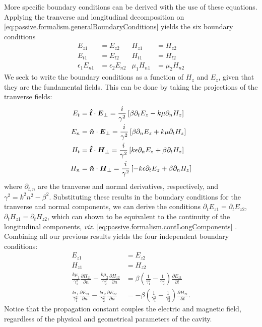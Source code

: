More specific boundary conditions can be derived with the use of these equations.
Applying the tranverse and longitudinal decomposition on \eqref{eq:passive.formalism.generalBoundaryConditions}
yields the six boundary conditions
  \begin{align*}
   E_{z1}		&= E_{z2}		& H_{z1}	&= H_{z2}	\label{eq:passive.formalism.contLongComponents}\\
   E_{t1}		&= E_{t2}		& H_{t1}	&= H_{t2}	\\
   \epsilon_1E_{n1}	&= \epsilon_2E_{n2}	& \mu_1H_{n1}	&= \mu_2H_{n2}
  \end{align*}
We seek to write the boundary conditions as a function of $H_z$ and $E_z$,
given that they are the fundamental fields. This can be done by taking
the projections of the tranverse fields:
  \begin{subequations}
  \begin{align}
   E_t	&= \boldsymbol{\hat{t}}\cdot\boldsymbol{E}_\perp = \frac{i}{\gamma^2}\left[\beta\partial_tE_z-k\mu\partial_nH_z\right]	\\
   E_n	&= \boldsymbol{\hat{n}}\cdot\boldsymbol{E}_\perp = \frac{i}{\gamma^2}\left[\beta\partial_nE_z+k\mu\partial_tH_z\right]	\\
   H_t	&= \boldsymbol{\hat{t}}\cdot\boldsymbol{H}_\perp = \frac{i}{\gamma^2}\left[k\epsilon\partial_nE_z+\beta\partial_tH_z\right]	\\
   H_n	&= \boldsymbol{\hat{n}}\cdot\boldsymbol{H}_\perp = \frac{i}{\gamma^2}\left[-k\epsilon\partial_tE_z+\beta\partial_nH_z\right]	
  \end{align}
  \end{subequations}
where $\partial_{t,n}$ are the tranverse and normal derivatives, respectively, and $\gamma^2=k^2n^2-\beta^2$.
Substituting these results in the boundary conditions for the tranverse and normal components, we can 
derive the conditions $\partial_tE_{z1}=\partial_tE_{z2}$, $\partial_tH_{z1}=\partial_tH_{z2}$, which can 
shown to be equivalent to the continuity of the longitudinal components, 
\textit{viz.} \eqref{eq:passive.formalism.contLongComponents} \cite{SCH2004}.
Combining all our previous results yields the four independent 
boundary conditions:
  \begin{subequations}
  \label{eq:passive.formalism.cylindricalBoundaryConditions}
  \begin{align}
   E_{z1}	&= E_{z2}	\\
   H_{z1}	&= H_{z2}	\\
   \frac{k\mu_1}{\gamma_1^2}\frac{\partial H_{z1}}{\partial n}-\frac{k\mu_2}{\gamma_2^2}\frac{\partial H_{z2}}{\partial n} & = \beta\left(\frac{1}{\gamma_1^2}-\frac{1}{\gamma_2^2}\right)\frac{\partial E_{z1}}{\partial t}\\
   \frac{k\epsilon_1}{\gamma_1^2}\frac{\partial E_{z1}}{\partial n}-\frac{k\epsilon_2}{\gamma_2^2}\frac{\partial E_{z2}}{\partial n} & = -\beta\left(\frac{1}{\gamma_1^2}-\frac{1}{\gamma_2^2}\right)\frac{\partial H_{z1}}{\partial t}.
  \end{align}
  \end{subequations}
Notice that the propagation constant couples the electric 
and magnetic field, regardless of the physical and geometrical
parameters of the cavity. 

